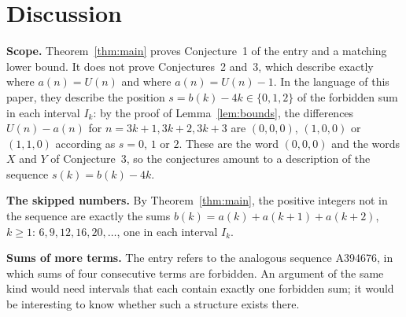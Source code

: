 \documentclass[11pt,a4paper]{article}
\theoremstyle{definition}
\theoremstyle{remark}
\newcommand{\para}[1]{\par\medskip\noindent\textbf{#1}\enspace}
\begin{document}
\section{Discussion}\label{sec:discussion}

\para{Scope.} Theorem~\ref{thm:main} proves Conjecture~1 of the entry and a matching lower bound. It does not prove
Conjectures~2 and~3, which describe exactly where $a(n)=U(n)$ and where $a(n)=U(n)-1$. In the language of this paper,
they describe the position $s=b(k)-4k\in\{0,1,2\}$ of the forbidden sum in each interval $I_k$: by the proof of
Lemma~\ref{lem:bounds}, the differences $U(n)-a(n)$ for $n=3k+1,3k+2,3k+3$ are $(0,0,0)$, $(1,0,0)$ or $(1,1,0)$ according as
$s=0$, $1$ or $2$. These are the word $(0,0,0)$ and the words $X$ and $Y$ of Conjecture~3, so the conjectures amount to
a description of the sequence $s(k)=b(k)-4k$.

\para{The skipped numbers.} By Theorem~\ref{thm:main}, the positive integers not in the sequence are exactly the sums
$b(k)=a(k)+a(k+1)+a(k+2)$, $k\ge1$: $6,9,12,16,20,\dots$, one in each interval $I_k$.

\para{Sums of more terms.} The entry refers to the analogous sequence A394676, in which sums of four consecutive terms
are forbidden. An argument of the same kind would need intervals that each contain exactly one forbidden sum; it would
be interesting to know whether such a structure exists there.
\end{document}
